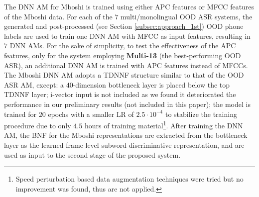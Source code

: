 \documentclass[a4paper]{article}
\begin{document}
The DNN AM for Mboshi is trained using either APC features or MFCC features of the Mboshi data. 
For each of  the $7$ multi/monolingual OOD ASR systems, the generated and post-processed (see Section \ref{subsec:approach_1st}) OOD phone labels are used    to train one DNN AM with MFCC as input features, resulting in $7$ DNN AMs. 
For the sake of simplicity, to test the effectiveness of the APC features,  only for the system employing \textbf{Multi-13} (the best-performing OOD ASR),  an additional DNN AM is trained with APC features instead of MFCCs. 
The Mboshi DNN AM adopts a  TDNNF structure similar to that of the OOD ASR AM, except: a $40$-dimension bottleneck layer is  placed below the top TDNNF layer; i-vector input is not included as we found it deteriorated the performance in our preliminary results (not included in this paper);
the model is trained for $20$ epochs with a smaller LR of $2.5\cdot 10^{-4}$ to stabilize the training procedure due to only $4.5$ hours of training material\footnote{Speed perturbation based data augmentation techniques were tried but no improvement was found, thus are not applied.}.  After training the  DNN AM, the BNF for the Mboshi representations are extracted from the bottleneck layer  as the  learned frame-level subword-discriminative representation, and are used as input to the 
second stage of the proposed system.
\end{document}

